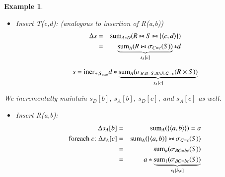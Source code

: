 \documentclass{article}
\newtheorem{example}[theorem]{Example}
\newcommand{\tuple}[1]{{\langle#1\rangle}}
\begin{document}
\begin{example}
\begin{itemize}
Derivation by current rules:
\begin{eqnarray*}
s &=&  \algnew_{+S(b,c)}
 \algsum_{A*D}(\sigma_{R.B=S.B \wedge S.C=T.C}(R \times S \times T))
\\
&\stackrel{(\ref{eq:agg2}), (\ref{eq:a5}), (\ref{eq:b6}), (\ref{eq:b5})}{=}&
\algincr_{+,S_{sum}} \algsum_{A*D}
(\sigma_{R.B=S.B \wedge S.C=T.C}(R \times (\Delta_{+S(b,c)} S) \times T))
\\
&\stackrel{(\ref{eq:b1})}{=}&
\algincr_{+,S_{sum}} \algsum_{A*D}
(\sigma_{R.B=S.B \wedge S.C=T.C}(R \times \{b,c\} \times T))
\\
&=& \algincr_{+,S_{sum}} \algsum_{A*D}
(\sigma_{R.B=b \wedge c=T.C}(R \times \{\} \times T))
\\
&=& \algincr_{+,S_{sum}} \algsum_{A*D}
(\sigma_{B=b}(R) \times \sigma_{C=c}(T))
\\
&\stackrel{(\ref{eq:sum7})}{=}& \algincr_{+,S_{sum}}
\underbrace{\algsum_{A} (\sigma_{B=b}(R))}_{s_A[b]} *
\underbrace{\algsum_{D}(\sigma_{C=c}(T))}_{s_D[c]}
\end{eqnarray*}
%
Note how the algebra expression here decomposes into smaller parts.

\item
Insert T(c,d): (analogous to insertion of R(a,b))
\begin{eqnarray*}
\Delta s &=& \algsum_{A*D}(R \bowtie S \bowtie \{\tuple{c,d}\})
\\ &=&
\underbrace{\algsum_{A}(R \bowtie \sigma_{C=c}(S))}_{s_A[c]} * d
\end{eqnarray*}

\begin{eqnarray*}
s = \mathrm{incr}_{+,S_{sum}} d*
\underbrace{\mathrm{sum}_{A} (\sigma_{R.B=S.B \wedge S.C=c}(R \times S))}_{s_A[c]}
\end{eqnarray*}
\end{itemize}

We incrementally maintain $s_D[b]$, $s_A[b]$, $s_D[c]$, and
$s_A[c]$ as well.

\begin{itemize}
\item
Insert R(a,b):
\begin{eqnarray*}
\Delta s_A[b] &=& \algsum_{A}(\{\tuple{a,b}\}) = a
\\
\mbox{foreach $c$: }
\Delta s_A[c] &=& \algsum_{A}(\{\tuple{a,b}\} \bowtie \sigma_{C=c}(S))
\\ &=&
\algsum_{a}(\sigma_{BC=bc}(S))
\\ &=&
a * \underbrace{\algsum_{1}(\sigma_{BC=bc}(S))}_{s_1[b,c]}
\end{eqnarray*}


\end{itemize}
\end{example}
\end{document}
